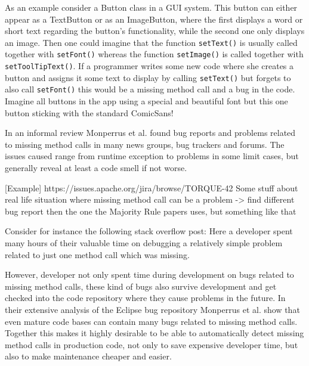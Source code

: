 As an example consider a Button class in a GUI system.
This button can either appear as a TextButton or as an ImageButton, where the first displays a word or short text regarding the button's functionality, while the second one only displays an image.
Then one could imagine that the function \texttt{setText()} is usually called together with \texttt{setFont()} whereas the function \texttt{setImage()} is called together with \texttt{setToolTipText()}.
If a programmer writes some new code where she creates a button and assigns it some text to display by calling \texttt{setText()} but forgets to also call \texttt{setFont()} this would be a missing method call and a bug in the code.
Imagine all buttons in the app using a special and beautiful font but this one button sticking with the standard ComicSans!

In an informal review Monperrus et al. \cite{monperrus2010detecting} found bug reports and problems related to missing method calls in many news groups, bug trackers and forums.
The issues caused range from runtime exception to problems in some limit cases, but generally reveal at least a code smell if not worse.

[Example]
https://issues.apache.org/jira/browse/TORQUE-42
Some stuff about real life situation where missing method call can be a problem
-> find different bug report then the one the Majority Rule papers uses, but something like that

Consider for instance the following stack overflow post:
Here a developer spent many hours of their valuable time on debugging a relatively simple problem related to just one method call which was missing.

However, developer not only spent time during development on bugs related to missing method calls, these kind of bugs also survive development and get checked into the code repository where they cause problems in the future.
In their extensive analysis of the Eclipse bug repository Monperrus et al. \cite{monperrus2013detecting} show that even mature code bases can contain many bugs related to missing method calls.
Together this makes it highly desirable to be able to automatically detect missing method calls in production code, not only to save expensive developer time, but also to make maintenance cheaper and easier.

